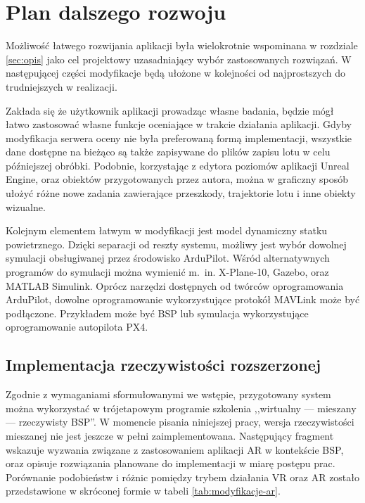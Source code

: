 \newpage
\section{Plan dalszego rozwoju}
Możliwość łatwego rozwijania aplikacji była wielokrotnie wspominana w rozdziale \ref{sec:opis} jako cel projektowy uzasadniający wybór zastosowanych rozwiązań. W następującej części modyfikacje będą ułożone w kolejności od najprostszych do trudniejszych w realizacji.

Zakłada się że użytkownik aplikacji prowadząc własne badania, będzie mógł łatwo zastosować własne funkcje oceniające w trakcie działania aplikacji. Gdyby modyfikacja serwera oceny nie była preferowaną formą implementacji, wszystkie dane dostępne na bieżąco są także zapisywane do plików zapisu lotu w celu późniejszej obróbki. Podobnie, korzystając z edytora poziomów aplikacji Unreal Engine, oraz obiektów przygotowanych przez autora, można w graficzny sposób ułożyć różne nowe zadania zawierające przeszkody, trajektorie lotu i inne obiekty wizualne.

Kolejnym elementem łatwym w modyfikacji jest model dynamiczny statku powietrznego. Dzięki separacji od reszty systemu, możliwy jest wybór dowolnej symulacji obsługiwanej przez środowisko ArduPilot. Wśród alternatywnych programów do symulacji można wymienić m.~in. X-Plane-10, Gazebo, oraz MATLAB Simulink. Oprócz narzędzi dostępnych od twórców oprogramowania ArduPilot, dowolne oprogramowanie wykorzystujące protokół MAVLink może być podłączone. Przykładem może być BSP lub symulacja wykorzystujące oprogramowanie autopilota PX4.

\subsection{Implementacja rzeczywistości rozszerzonej}
Zgodnie z wymaganiami sformułowanymi we wstępie, przygotowany system można wykorzystać w trójetapowym programie szkolenia ,,wirtualny --- mieszany --- rzeczywisty BSP''. W momencie pisania niniejszej pracy, wersja rzeczywistości mieszanej nie jest jeszcze w pełni zaimplementowana. Następujący fragment wskazuje wyzwania związane z zastosowaniem aplikacji AR w kontekście BSP, oraz opisuje rozwiązania planowane do implementacji w miarę postępu prac. Porównanie podobieństw i różnic pomiędzy trybem działania VR oraz AR zostało przedstawione w skróconej formie w tabeli \ref{tab:modyfikacje-ar}.

